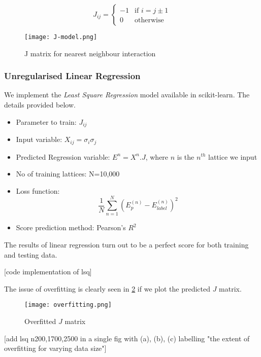 \begin{equation*}
    J_{ij} = \left\{
        \begin{array}{ll}
            -1 & \mbox{if } i = j \pm 1\\
            0 & \mbox{otherwise}
        \end{array}
    \right.
\end{equation*}

\begin{figure}[H]
    \centering
    \texttt{[image: J-model.png]}
    \caption{J matrix for nearest neighbour interaction}
    \label{fig:j-matrix}
\end{figure}

\subsubsection{Unregularised Linear Regression}
We implement the \emph{Least Square Regression} model available in scikit-learn. The details provided below.
\begin{itemize}
    \item Parameter to train: \(J_{ij}\)
    \item Input variable: \(X_{ij}=\sigma_i\sigma_j\)
    \item Predicted Regression variable: \(E^n=X^n.J\), where $n$ is the $n^{th}$ lattice we input
    \item No of training lattices: N=10,000
    \item Loss function:
        \begin{equation*}
           \frac{1}{N} \sum_{n=1}^N(E_p^{(n)}-E_{label}^{(n)})^2
        \end{equation*}
    \item Score prediction method: Pearson's \(R^2\)
\end{itemize}

The results of linear regression turn out to be a perfect score for both training and testing data.

[code implementation of lsq]

The issue of overfitting is clearly seen in \cref{fig:overfit} if we plot the predicted $J$ matrix.

\begin{figure}[H]
    \centering
    \texttt{[image: overfitting.png]}
    \caption{Overfitted $J$ matrix}
    \label{fig:overfit}
\end{figure}


[add lsq n200,1700,2500 in a single fig with (a), (b), (c) labelling "the extent of overfitting for varying data size"]

